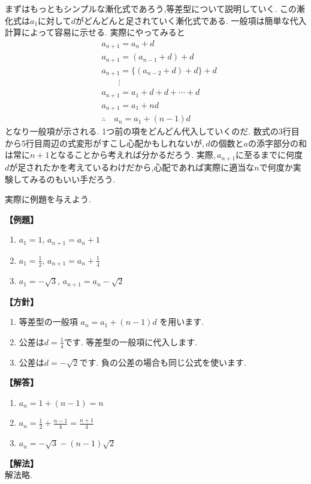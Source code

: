 
まずはもっともシンプルな漸化式であろう,等差型について説明していく.
この漸化式は$a_1$に対して$d$がどんどんと足されていく漸化式である.
一般項は簡単な代入計算によって容易に示せる.
実際にやってみると
\begin{align*}
   & a_{n+1}=a_n+d                   \\
   & a_{n+1}=(a_{n-1}+d)+d           \\
   & a_{n+1}=\{(a_{n-2}+d)+d\}+d     \\
   & \qquad \vdots                   \\
   & a_{n+1}=a_1+d+d+\cdots+d        \\
   & a_{n+1}=a_1+nd                  \\
   & \therefore \quad a_n=a_1+(n-1)d
\end{align*}
となり一般項が示される.
1つ前の項をどんどん代入していくのだ.
数式の3行目から5行目周辺の式変形がすこし心配かもしれないが,\,$d$の個数と$a$の添字部分の和は常に$n+1$となることから考えれば分かるだろう.
実際,\,$a_{n+1}$に至るまでに何度$d$が足されたかを考えているわけだから,心配であれば実際に適当な$n$で何度か実験してみるのもいい手だろう.

実際に例題を与えよう.

\noindent \textbf{【例題】}
\begin{enumerate}[label=(\arabic*),parsep=3pt]
  \item $\displaystyle a_1=1,\, a_{n+1}=a_n+1$
  \item $\displaystyle a_1=\frac{1}{2},\, a_{n+1}=a_n+\frac{1}{4}$
  \item $\displaystyle a_1=-\sqrt{3},\, a_{n+1}=a_n-\sqrt{2}$
\end{enumerate}

\noindent\textbf{【方針】}
\begin{enumerate}[label=(\arabic*),parsep=3pt]
  \item 等差型の一般項
        $\displaystyle a_n=a_1+(n-1)d$
        を用います.
  \item 公差は$\displaystyle d=\frac14$です.
        等差型の一般項に代入します.
  \item 公差は$\displaystyle d=-\sqrt2$です.
        負の公差の場合も同じ公式を使います.
\end{enumerate}

\noindent\textbf{【解答】}
\begin{enumerate}[label=(\arabic*),parsep=3pt]
  \item $\displaystyle a_n=1+(n-1)=n$
  \item $\displaystyle a_n=\frac12+\frac{n-1}{4}
          =\frac{n+1}{4}$
  \item $\displaystyle a_n=-\sqrt3-(n-1)\sqrt2$
\end{enumerate}

\noindent\textbf{【解法】}\\
解法略.
